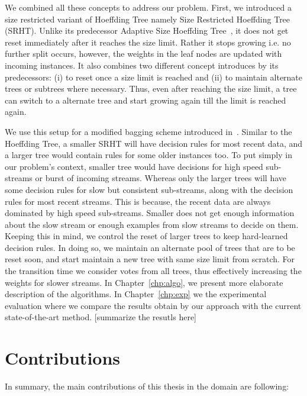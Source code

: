 We combined all these concepts to address our problem. First, we introduced a size restricted variant of Hoeffding Tree namely Size Restricted Hoeffding Tree (SRHT). Unlike its predecessor Adaptive Size Hoeffding Tree~\cite{bifet09:asht}, it does not get reset immediately after it reaches the size limit. Rather it stops growing i.e. no further split occurs, however, the weights in the leaf nodes are updated with incoming instances. It also combines two different concept introduces by its predecessors: (i) to reset once a size limit is reached and (ii) to maintain alternate trees or subtrees where necessary. Thus, even after reaching the size limit, a tree can switch to a alternate tree and start growing again till the limit is reached again. 

We use this setup for a modified bagging scheme introduced in~\cite{bifet09:asht}. Similar to the Hoeffding Tree, a smaller SRHT will have decision rules for most recent data, and a larger tree would contain rules for some older instances too. To put simply in our problem's context, smaller tree would have decisions for high speed sub-streams or burst of incoming streams. Whereas only the larger trees will have some decision rules for slow but consistent sub-streams, along with the decision rules for most recent streams. This is because, the recent data are always dominated by high speed sub-streams. Smaller does not get enough information about the slow stream or enough examples from slow streams to decide on them. Keeping this in mind, we control the reset of larger trees to keep hard-learned decision rules. In doing so, we maintain an alternate pool of trees that are to be reset soon, and start maintain a new tree with same size limit from scratch. For the transition time we consider votes from all trees, thus effectively increasing the weights for slower streams. In Chapter~\ref{chp:algo}, we present more elaborate description of the algorithms. In Chapter~\ref{chp:exp} we the  experimental evaluation where we compare the results obtain by our approach with the current state-of-the-art method. [summarize the resutls here]

\section{Contributions}
In summary, the main contributions of this thesis in the domain are following:

